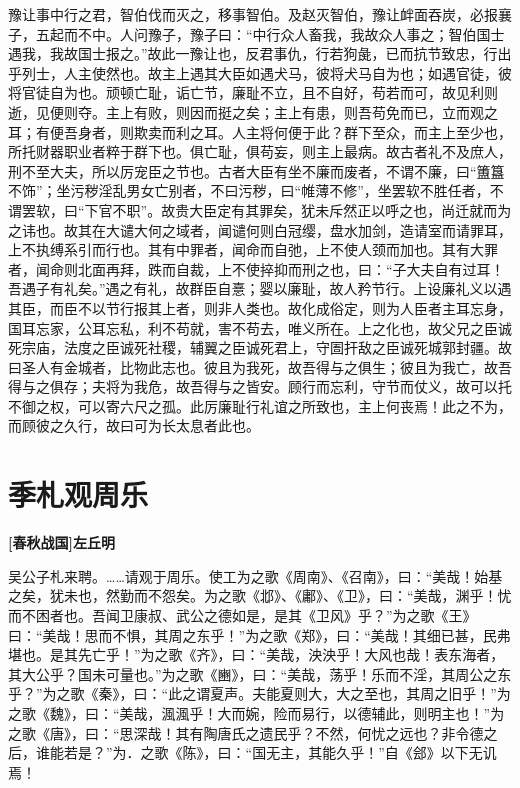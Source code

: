 \documentclass[UTF8,titlepage,oneside]{ctexbook}
\begin{document}
豫让事中行之君，智伯伐而灭之，移事智伯。及赵灭智伯，豫让衅面吞炭，必报襄子，五起而不中。人问豫子，豫子曰：“中行众人畜我，我故众人事之；智伯国士遇我，我故国士报之。”故此一豫让也，反君事仇，行若狗彘，已而抗节致忠，行出乎列士，人主使然也。故主上遇其大臣如遇犬马，彼将犬马自为也；如遇官徒，彼将官徒自为也。顽顿亡耻，诟亡节，廉耻不立，且不自好，苟若而可，故见利则逝，见便则夺。主上有败，则因而挺之矣；主上有患，则吾苟免而已，立而观之耳；有便吾身者，则欺卖而利之耳。人主将何便于此？群下至众，而主上至少也，所托财器职业者粹于群下也。俱亡耻，俱苟妄，则主上最病。故古者礼不及庶人，刑不至大夫，所以厉宠臣之节也。古者大臣有坐不廉而废者，不谓不廉，曰“簠簋不饰”；坐污秽淫乱男女亡别者，不曰污秽，曰“帷薄不修”，坐罢软不胜任者，不谓罢软，曰“下官不职”。故贵大臣定有其罪矣，犹未斥然正以呼之也，尚迁就而为之讳也。故其在大谴大何之域者，闻谴何则白冠缨，盘水加剑，造请室而请罪耳，上不执缚系引而行也。其有中罪者，闻命而自弛，上不使人颈而加也。其有大罪者，闻命则北面再拜，跌而自裁，上不使捽抑而刑之也，曰：“子大夫自有过耳！吾遇子有礼矣。”遇之有礼，故群臣自憙；婴以廉耻，故人矜节行。上设廉礼义以遇其臣，而臣不以节行报其上者，则非人类也。故化成俗定，则为人臣者主耳忘身，国耳忘家，公耳忘私，利不苟就，害不苟去，唯义所在。上之化也，故父兄之臣诚死宗庙，法度之臣诚死社稷，辅翼之臣诚死君上，守圄扞敌之臣诚死城郭封疆。故曰圣人有金城者，比物此志也。彼且为我死，故吾得与之俱生；彼且为我亡，故吾得与之俱存；夫将为我危，故吾得与之皆安。顾行而忘利，守节而仗义，故可以托不御之权，可以寄六尺之孤。此厉廉耻行礼谊之所致也，主上何丧焉！此之不为，而顾彼之久行，故曰可为长太息者此也。



\chapter*{季札观周乐}
\begin{center}
	\textbf{[春秋战国]左丘明}
\end{center}


吴公子札来聘。……请观于周乐。使工为之歌《周南》、《召南》，曰：“美哉！始基之矣，犹未也，然勤而不怨矣。为之歌《邶》、《鄘》、《卫》，曰：“美哉，渊乎！忧而不困者也。吾闻卫康叔、武公之德如是，是其《卫风》乎？”为之歌《王》曰：“美哉！思而不惧，其周之东乎！”为之歌《郑》，曰：“美哉！其细已甚，民弗堪也。是其先亡乎！”为之歌《齐》，曰：“美哉，泱泱乎！大风也哉！表东海者，其大公乎？国未可量也。”为之歌《豳》，曰：“美哉，荡乎！乐而不淫，其周公之东乎？”为之歌《秦》，曰：“此之谓夏声。夫能夏则大，大之至也，其周之旧乎！”为之歌《魏》，曰：“美哉，渢渢乎！大而婉，险而易行，以德辅此，则明主也！”为之歌《唐》，曰：“思深哉！其有陶唐氏之遗民乎？不然，何忧之远也？非令德之后，谁能若是？”为．之歌《陈》，曰：“国无主，其能久乎！”自《郐》以下无讥焉！
\end{document}
